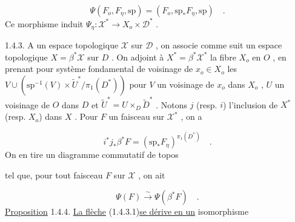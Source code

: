 \begin{equation*}
\Psi(F_o, F_\eta , \mathrm{sp}) = (F_o, \mathrm{sp}_* F_\eta , \mathrm{sp}) \quad .
\end{equation*}
Ce morphisme induit $\Psi_\eta : \mathcal{X}^* \longrightarrow X_o \times \mathcal{D}^*$ .

1.4.3. A un espace topologique $\mathcal{X}$ sur $\mathcal{D}$ , on associe comme suit un espace topologique $X = \beta^* \mathcal{X}$ sur $D$ . On adjoint à $X^* = \beta^* \mathcal{X}^*$ la fibre $X_o$ en $O$ , en prenant pour système fondamental de voisinage de $x_o \in X_o$ les $V \cup (\mathrm{sp}^{-1}(V) \times \widetilde{U}^*/\pi_1(D^*))$ pour $V$ un voisinage de $x_o$ dans $X_o$ , $U$ un voisinage de $O$ dans $D$ et $\widetilde{U}^* = U \times_D \widetilde{D}^*$ . Notons $j$ (resp. $i$) l'inclusion de $X^*$ (resp. $X_o$) dans $X$ . Pour $F$ un faisceau sur $\mathcal{X}^*$ , on a

\begin{equation*}
i^* j_* \beta^* F = (\mathrm{sp}_* F_\eta)^{\pi_1(D^*)} \quad .
\end{equation*}
On en tire un diagramme commutatif de topos

\begin{center}
\end{center}
tel que, pour tout faisceau $F$ sur $\mathcal{X}$ , on ait

\begin{equation}\tag{1.4.3.1}
\Psi(F) \stackrel{\sim}{\longrightarrow} \Psi(\beta^* F) \quad .
\end{equation}
\underline{Proposition} 1.4.4. \underline{La flèche} (1.4.3.1)\underline{se dérive en un} isomorphisme

